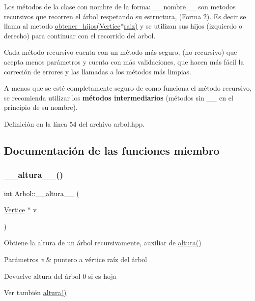 Los métodos de la clase con nombre de la forma\+: \+\_\+\+\_\+nombre\+\_\+\+\_\+ son metodos recursivos que recorren el árbol respetando su estructura, (Forma 2). Es decir se llama al metodo \hyperlink{classArbol_a18066699977ab8095398d026ef2a13ac}{obtener\+\_\+hijos(\+Vertice$\ast$raiz)} y se utilizan sus hijos (izquierdo o derecho) para continuar con el recorrido del arbol.

Cada método recursivo cuenta con un método más seguro, (no recursivo) que acepta menos parámetros y cuenta con más validaciones, que hacen más fácil la correción de errores y las llamadas a los métodos más limpias.

A menos que se esté completamente seguro de como funciona el método recursivo, se recomienda utilizar los {\bfseries métodos intermediarios} (métodos sin \+\_\+\+\_\+ en el principio de su nombre). 

Definición en la línea 54 del archivo arbol.\+hpp.



\subsection{Documentación de las funciones miembro}
\mbox{\label{classArbol_ab34b0a58f349a2f8153911ad4821a9b9}} 
\subsubsection{\texorpdfstring{\+\_\+\+\_\+altura\+\_\+\+\_\+()}{\_\_altura\_\_()}}
{\footnotesize\ttfamily int Arbol\+::\+\_\+\+\_\+altura\+\_\+\+\_\+ (\begin{DoxyParamCaption}\item[{\hyperlink{classVertice}{Vertice} $\ast$}]{v }\end{DoxyParamCaption})\hspace{0.3cm}{\ttfamily [protected]}}



Obtiene la altura de un árbol recursivamente, auxiliar de \hyperlink{classArbol_a98151655f0dab81b40d34f87fbbd90cd}{altura()} 


\begin{DoxyParams}{Parámetros}
{\em v} & puntero a vértice raíz del árbol \\
\hline
\end{DoxyParams}
\begin{DoxyReturn}{Devuelve}
altura del árbol 0 si es hoja 
\end{DoxyReturn}
\begin{DoxySeeAlso}{Ver también}
\hyperlink{classArbol_a98151655f0dab81b40d34f87fbbd90cd}{altura()} 
\end{DoxySeeAlso}


